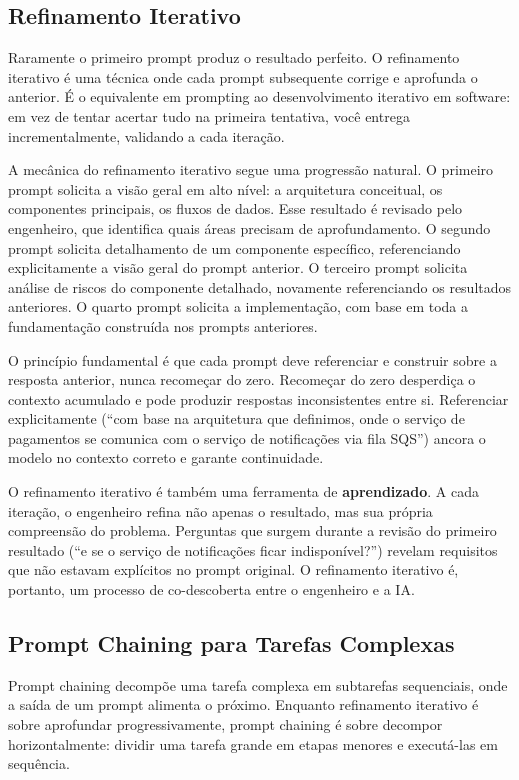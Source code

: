 \subsection{Refinamento Iterativo}

Raramente o primeiro prompt produz o resultado perfeito. O refinamento iterativo
é uma técnica onde cada prompt subsequente corrige e aprofunda o anterior. É o
equivalente em prompting ao desenvolvimento iterativo em software: em vez de
tentar acertar tudo na primeira tentativa, você entrega incrementalmente,
validando a cada iteração.

A mecânica do refinamento iterativo segue uma progressão natural. O primeiro
prompt solicita a visão geral em alto nível: a arquitetura conceitual, os
componentes principais, os fluxos de dados. Esse resultado é revisado pelo
engenheiro, que identifica quais áreas precisam de aprofundamento. O segundo
prompt solicita detalhamento de um componente específico, referenciando
explicitamente a visão geral do prompt anterior. O terceiro prompt solicita
análise de riscos do componente detalhado, novamente referenciando os resultados
anteriores. O quarto prompt solicita a implementação, com base em toda a
fundamentação construída nos prompts anteriores.

O princípio fundamental é que cada prompt deve referenciar e construir sobre a
resposta anterior, nunca recomeçar do zero. Recomeçar do zero desperdiça o
contexto acumulado e pode produzir respostas inconsistentes entre si. Referenciar
explicitamente (``com base na arquitetura que definimos, onde o serviço de
pagamentos se comunica com o serviço de notificações via fila SQS'') ancora o
modelo no contexto correto e garante continuidade.

O refinamento iterativo é também uma ferramenta de \textbf{aprendizado}. A cada
iteração, o engenheiro refina não apenas o resultado, mas sua própria compreensão
do problema. Perguntas que surgem durante a revisão do primeiro resultado
(``e se o serviço de notificações ficar indisponível?'') revelam requisitos que
não estavam explícitos no prompt original. O refinamento iterativo é, portanto,
um processo de co-descoberta entre o engenheiro e a IA.

\subsection{Prompt Chaining para Tarefas Complexas}

Prompt chaining decompõe uma tarefa complexa em subtarefas sequenciais, onde a
saída de um prompt alimenta o próximo. Enquanto refinamento iterativo é sobre
aprofundar progressivamente, prompt chaining é sobre decompor horizontalmente:
dividir uma tarefa grande em etapas menores e executá-las em sequência.

